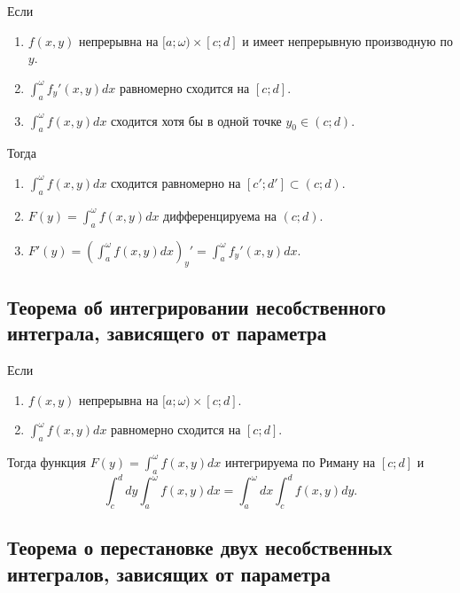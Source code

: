 \begin{theorem}\label{theorem:7.3.2}
    Если
    \begin{enumerate}
        \item $ f(x,y) $ непрерывна на $ [a;\omega)\times[c;d] $ и имеет непрерывную производную по $ y $.
        \item $ \int_{a}^{\omega}f_y'(x,y)dx $ равномерно сходится на $ [c;d] $.
        \item $ \int_{a}^{\omega}f(x,y)dx $ сходится хотя бы в одной точке $ y_0 \in (c;d) $.
    \end{enumerate}

    Тогда
    \begin{enumerate}
        \item $ \int_{a}^{\omega}f(x,y)dx $ сходится равномерно на $ [c';d']\subset (c;d) $.
        \item $ F(y) = \int_{a}^{\omega}f(x,y)dx $ дифференцируема на $ (c;d) $.
        \item $ F'(y) = \left(\int_{a}^{\omega}f(x,y)dx\right)_y' = \int_{a}^{\omega}f_y'(x,y)dx $.
    \end{enumerate}
\end{theorem}

\subsection{Теорема об интегрировании несобственного интеграла, зависящего от параметра}

\begin{theorem}\label{theorem:7.3.3}
    Если
    \begin{enumerate}
        \item $ f(x,y) $ непрерывна на $ [a;\omega)\times[c;d] $.
        \item $ \int_{a}^{\omega}f(x,y)dx $ равномерно сходится на $ [c;d] $.
    \end{enumerate}

    Тогда функция $ F(y) = \int_{a}^{\omega}f(x,y)dx $ интегрируема по Риману на $ [c;d] $ и
    \[
        \int_{c}^{d}dy \int_{a}^{\omega}f(x,y)dx = \int_{a}^{\omega}dx \int_{c}^{d}f(x,y)dy.
    \]
\end{theorem}

\newpage

\subsection{Теорема о перестановке двух несобственных интегралов, зависящих от параметра}

